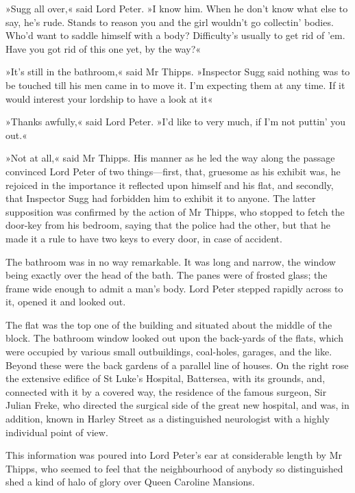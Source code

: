 »Sugg all over,« said Lord Peter. »I know him. When he don't know what else to say, he's rude. Stands to reason you and the girl wouldn't go collectin' bodies. Who'd want to saddle himself with a body? Difficulty's usually to get rid of 'em. Have you got rid of this one yet, by the way?«

»It's still in the bathroom,« said Mr Thipps. »Inspector Sugg said nothing was to be touched till his men came in to move it. I'm expecting them at any time. If it would interest your lordship to have a look at it\longdash«

»Thanks awfully,« said Lord Peter. »I'd like to very much, if I'm not puttin' you out.«

»Not at all,« said Mr Thipps. His manner as he led the way along the passage convinced Lord Peter of two things\allowbreak---\allowbreak first, that, gruesome as his exhibit was, he rejoiced in the importance it reflected upon himself and his flat, and secondly, that Inspector Sugg had forbidden him to exhibit it to anyone. The latter supposition was confirmed by the action of Mr Thipps, who stopped to fetch the door-key from his bedroom, saying that the police had the other, but that he made it a rule to have two keys to every door, in case of accident.

The bathroom was in no way remarkable. It was long and narrow, the window being exactly over the head of the bath. The panes were of frosted glass; the frame wide enough to admit a man's body. Lord Peter stepped rapidly across to it, opened it and looked out.

The flat was the top one of the building and situated about the middle of the block. The bathroom window looked out upon the back-yards of the flats, which were occupied by various small outbuildings, coal-holes, garages, and the like. Beyond these were the back gardens of a parallel line of houses. On the right rose the extensive edifice of St Luke's Hospital, Battersea, with its grounds, and, connected with it by a covered way, the residence of the famous surgeon, Sir Julian Freke, who directed the surgical side of the great new hospital, and was, in addition, known in Harley Street as a distinguished neurologist with a highly individual point of view.

This information was poured into Lord Peter's ear at considerable length by Mr Thipps, who seemed to feel that the neighbourhood of anybody so distinguished shed a kind of halo of glory over Queen Caroline Mansions.

